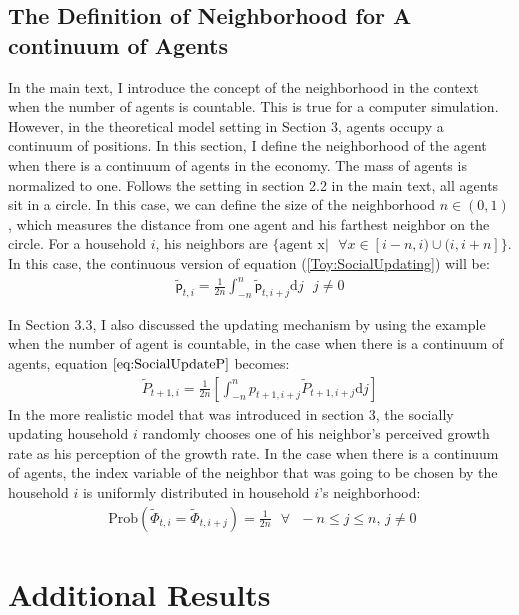 \documentclass[12pt,letterpaper]{article}
\begin{document}
\subsection{The Definition of Neighborhood for A continuum of Agents}
In the main text, I introduce the concept of the neighborhood in the context when the number of agents is countable. This is true for a computer simulation. However, in the theoretical model setting in Section 3, agents occupy a continuum of positions. In this section, I define the neighborhood of the agent when there is a continuum of agents in the economy. The mass of agents is normalized to one. Follows the setting in section 2.2 in the main text, all agents sit in a circle. In this case, we can define the size of the neighborhood $n \in (0,1)$, which measures the distance from one agent and his farthest neighbor on the circle. For a household $i$, his neighbors are $\{\text{agent x}|\text{ }\forall x\in [i-n,i)\cup(i,i+n]\}$. In this case, the continuous version of equation (\ref{Toy:SocialUpdating}) will be:
\begin{eqnarray}
\tilde{\mathsf{p}}_{t,i}=\frac{1}{2n}\int_{-n}^{n}\tilde{\mathsf{p}}_{t,i+j}\text{d}j\text{    }j\neq 0
\end{eqnarray}
\par
In Section 3.3, I also discussed the updating mechanism by using the example when the number of agent is countable, in the case when there is a continuum of agents, equation $\ref{eq:SocialUpdateP}$ becomes:
\begin{eqnarray}
\tilde{P}_{t+1,i} = \frac{1}{2n}\left[\int_{-n}^{n}p_{t+1,i+j}\tilde{P}_{t+1,i+j}\text{d}j\right]
\end{eqnarray}
In the more realistic model that was introduced in section 3, the socially updating household $i$ randomly chooses one of his neighbor's perceived growth rate as his perception of the growth rate. In the case when there is a continuum of agents, the index variable of the neighbor that was going to be chosen by the household $i$ is uniformly distributed in household $i$'s neighborhood:
\begin{eqnarray}
\text{ Prob}(\tilde{\Phi}_{t,i}=\tilde{\Phi}_{t,i+j})=\frac{1}{2n}\text{ }\forall\text{ }-n\leq j\leq n\text{, }j\neq 0
\end{eqnarray}
\section{Additional Results}
\end{document}
